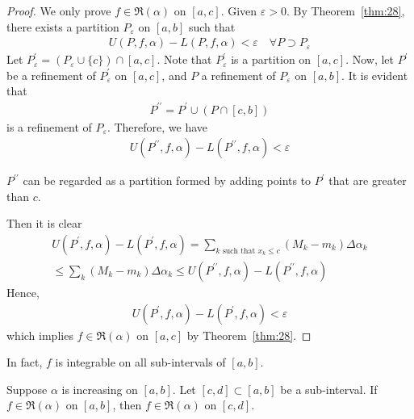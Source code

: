 \documentclass[thmcnt=section, 12pt]{my-elegantbook}
\begin{document}
\begin{proof}
    We only prove $f \in \mathfrak{R}(\alpha)$ on $[a, c]$. Given $\varepsilon > 0$. By Theorem~\ref{thm:28}, there exists a partition $P_\varepsilon$ on $[a, b]$ such that 
    \begin{align*}
        U(P,f,\alpha) - L(P,f,\alpha) < \varepsilon
        \quad \forall P \supset P_\varepsilon
    \end{align*}
    Let $P_\varepsilon^\prime = (P_\varepsilon \cup \{ c \}) \cap [a, c]$. Note that $P_\varepsilon^\prime$ is a partition on $[a, c]$. Now, let $P^\prime$ be a refinement of $ P_\varepsilon^\prime$ on $[a, c]$, and $P$ a refinement of $P_\varepsilon$ on $[a, b]$. It is evident that 
    \begin{align*}
        P^{\prime\prime} = P^\prime \cup (P \cap [c, b])
    \end{align*} 
    is a refinement of $P_\varepsilon$. Therefore, we have 
    \begin{align*}
        U(P^{\prime\prime},f,\alpha) - L(P^{\prime\prime},f,\alpha) < \varepsilon
    \end{align*}
    \begin{note}
        $P^{\prime\prime}$ can be regarded as a partition formed by adding points to $P^\prime$ that are greater than $c$.
    \end{note}
    Then it is clear 
    \begin{multline*}
        U(P^{\prime},f,\alpha) - L(P^{\prime},f,\alpha)
        = \sum_{k \text{ such that } x_k \leq c} (M_k - m_k) \Delta \alpha_k \\
        \leq \sum_{k} (M_k - m_k) \Delta \alpha_k
        \leq U(P^{\prime\prime},f,\alpha) - L(P^{\prime\prime},f,\alpha)
    \end{multline*}
    Hence,
    \begin{align*}
        U(P^{\prime},f,\alpha) - L(P^{\prime},f,\alpha) < \varepsilon
    \end{align*}
    which implies $f \in \mathfrak{R}(\alpha)$ on $[a, c]$ by Theorem~\ref{thm:28}.
\end{proof}

In fact, $f$ is integrable on all sub-intervals of $[a, b]$.


\begin{theorem} \label{thm:40}
    Suppose $\alpha$ is increasing on $[a, b]$. Let $[c, d] \subset [a, b]$ be a sub-interval. If $f \in \mathfrak{R}(\alpha)$ on $[a, b]$, then $f \in \mathfrak{R}(\alpha)$ on $[c, d]$.
\end{theorem}
\end{document}
